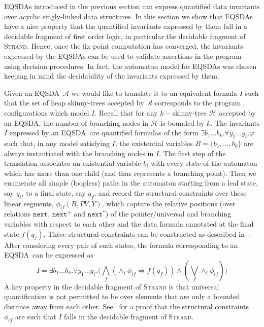 \documentclass{llncs}
\newcommand{\Strand}{\textsc{Strand}\xspace}
\newcommand{\A}{\mathcal{A}}
\newcommand{\next}{\texttt{next}}
\newcommand{\EQSDA}{\mbox{\sc EQSDA}}
\newcommand{\HC}{\mathcal{H}}
\begin{document}
\EQSDA s introduced in  the previous section can express quantified data invariants over acyclic singly-linked data structures. In this section we show that \EQSDA s have a nice property that the quantified invariants expressed by them fall in a decidable fragment of first order logic, in particular the decidable fragment of \Strand. Hence, once the fix-point computation has converged, the invariants expressed by the \EQSDA s can be used to validate assertions in the program using decision procedures. In fact, the automaton model for \EQSDA s was chosen keeping in mind the decidability of the invariants expressed by them.

Given an \EQSDA\ $\A$ we would like to translate it to an equivalent formula $I$ such that the set of heap skinny-trees accepted by $\A$ corresponds to the program configurations which model $I$.
Recall that for any $k-$skinny-tree $\HC$ accepted by an \EQSDA, the number of branching nodes in $\HC$ is bounded by $k$. The invariants $I$ expressed by an \EQSDA\ are quantified formulas of the form $\exists b_1 \ldots b_k. \forall y_1 \ldots y_{\ell}. \varphi$ such that, in any model satisfying $I$, the existential variables $B = \{b_1, \ldots, b_k\}$ are always instantiated with the branching nodes in $I$.
The first step of the translation associates an existential variable $b_i$ with every state of the automaton which has more than one child (and thus represents a branching point). Then we enumerate all simple (loopless) paths in the automaton starting from a leaf state, say $q_i$, to a final state, say $q_f$, and record the structural constraints over these linear segments, $\phi_{if}(B, PV, Y)$, which capture the relative positions (over relations $\next$, $\next^+$ and $\next^*$) of the pointer/universal and branching variables with respect to each other and the data formula annotated at the final state $f(q_f)$.
These structural constraints can be constructed as described in~\cite{CAVQDA}. After consdering every pair of such states, the formula corresponding to an \EQSDA\ can be expressed as
\[I =
\exists  b_1 \ldots b_k. \forall y_1 \ldots y_{\ell}. \big(
\bigwedge_f (\wedge_i \phi_{if} \Rightarrow f(q_f)) \wedge (\bigvee_f \wedge_i \phi_{if} )
\big)
\]
A key property in the decidable fragment of \Strand is that universal quantification is not permitted to be over elements that are only a bounded distance away from each other. See~\cite{CAVQDA} for a proof that the structural constraints $\phi_{if}$ are such that $I$ falls in the decidable fragment of \Strand.
\end{document}
